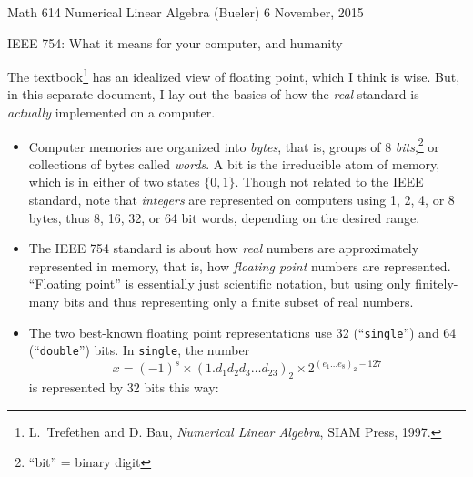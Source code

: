 \documentclass[11pt]{amsart}
\begin{document}
\scriptsize \noindent Math 614 Numerical Linear Algebra (Bueler) \hfill 6 November, 2015
\normalsize

\medskip\bigskip
\Large\centerline{IEEE 754: What it means for your computer, and humanity}

\bigskip\bigskip
\normalsize

\thispagestyle{empty}

The textbook\footnote{L.~Trefethen and D. Bau, \emph{Numerical Linear Algebra}, SIAM Press, 1997.} has an idealized view of floating point, which I think is wise.  But, in this separate document, I lay out the basics of how the \emph{real} standard is \emph{actually} implemented on a computer.

\bigskip
\begin{itemize}
\setlength\itemsep{1em}
\item Computer memories are organized into \emph{bytes}, that is, groups of 8 \emph{bits},\footnote{``bit'' = binary digit} or collections of bytes called \emph{words}.  A bit is the irreducible atom of memory, which is in either of two states $\{0,1\}$.  Though not related to the IEEE standard, note that \emph{integers} are represented on computers using 1, 2, 4, or 8 bytes, thus 8, 16, 32, or 64 bit words, depending on the desired range.

\item The IEEE 754 standard is about how \emph{real} numbers are approximately represented in memory, that is, how \emph{floating point} numbers are represented.  ``Floating point'' is essentially just scientific notation, but using only finitely-many bits and thus representing only a finite subset of real numbers.

\item The two best-known floating point representations use 32 (``\texttt{single}'') and 64 (``\texttt{double}'') bits.  In \texttt{single}, the number
       $$x = (-1)^s \times \left(1.d_1 d_2 d_3 \dots d_{23}\right)_{2} \times 2^{\left(e_1\dots e_8\right)_2 - 127}$$
is represented by 32 bits this way:

\medskip
\hspace{-30mm}


\end{itemize}
\end{document}

